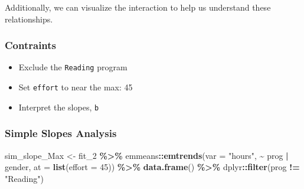 \documentclass[
]{article}
\newenvironment{Shaded}{\begin{snugshade}}{\end{snugshade}}
\newcommand{\AttributeTok}[1]{\textcolor[rgb]{0.13,0.29,0.53}{#1}}
\newcommand{\DecValTok}[1]{\textcolor[rgb]{0.00,0.00,0.81}{#1}}
\newcommand{\FunctionTok}[1]{\textcolor[rgb]{0.13,0.29,0.53}{\textbf{#1}}}
\newcommand{\NormalTok}[1]{#1}
\newcommand{\OtherTok}[1]{\textcolor[rgb]{0.56,0.35,0.01}{#1}}
\newcommand{\SpecialCharTok}[1]{\textcolor[rgb]{0.81,0.36,0.00}{\textbf{#1}}}
\newcommand{\StringTok}[1]{\textcolor[rgb]{0.31,0.60,0.02}{#1}}
\providecommand{\tightlist}{%
  \setlength{\itemsep}{0pt}\setlength{\parskip}{0pt}}
\begin{document}
Additionally, we can visualize the interaction to help us understand
these relationships.

\hypertarget{contraints}{%
\subsubsection{Contraints}\label{contraints}}

\begin{itemize}
\tightlist
\item
  Exclude the \texttt{Reading} program
\item
  Set \texttt{effort} to near the max: 45
\item
  Interpret the slopes, \texttt{b}
\end{itemize}

\clearpage

\hypertarget{simple-slopes-analysis-2}{%
\subsubsection{Simple Slopes Analysis}\label{simple-slopes-analysis-2}}

\begin{Shaded}
\begin{Highlighting}[]
\NormalTok{sim\_slope\_Max }\OtherTok{\textless{}{-}}\NormalTok{ fit\_2 }\SpecialCharTok{\%\textgreater{}\%} 
\NormalTok{  emmeans}\SpecialCharTok{::}\FunctionTok{emtrends}\NormalTok{(}\AttributeTok{var =} \StringTok{"hours"}\NormalTok{, }
                    \SpecialCharTok{\textasciitilde{}}\NormalTok{ prog }\SpecialCharTok{|}\NormalTok{ gender,}
                    \AttributeTok{at =} \FunctionTok{list}\NormalTok{(}\AttributeTok{effort =} \DecValTok{45}\NormalTok{)) }\SpecialCharTok{\%\textgreater{}\%} 
  \FunctionTok{data.frame}\NormalTok{() }\SpecialCharTok{\%\textgreater{}\%} 
\NormalTok{  dplyr}\SpecialCharTok{::}\FunctionTok{filter}\NormalTok{(prog }\SpecialCharTok{!=} \StringTok{"Reading"}\NormalTok{) }
\end{Highlighting}
\end{Shaded}
\end{document}
